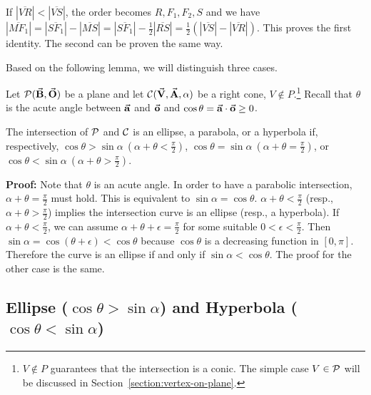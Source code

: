      If $|\overline{VR}|<|\overline{VS}|$, the order becomes $R,F_1,F_2,S$
and we have $|\overline{MF_1}|=|\overline{SF_1}|-|\overline{MS}|=
|\overline{SF_1}|-\frac{1}{2}|\overline{RS}|=\frac{1}{2}(|\overline{VS}|-
|\overline{VR}|)$.  
This proves the first identity.  The second can be proven the same way.  \QED

Based on the following lemma, we will distinguish three cases.

\begin{lemma}
\label{lemma:classification}
Let ${\cal P}(\vec{\bf B},\vec{\bf O})$ be a plane and 
let ${\cal C}(\vec{\bf V}, \vec{\bf A},\alpha)$ be a right cone, 
$V \not \in P$.\footnote{$V \not \in P$ guarantees that the 
     intersection is a conic.
     The simple case $V\in{\cal P}$ will be discussed in 
     Section~\ref{section:vertex-on-plane}.}
Recall that $\theta$
is the acute angle between $\vec{\bf a}$ and $\vec{\bf o}$ and 
$\cos\theta=\vec{\bf a}\cdot\vec{\bf o}\geq 0$.

     The intersection of ${\cal P}$ and ${\cal C}$
is an ellipse, a parabola, or a hyperbola if,
respectively, $\cos\theta>\sin\alpha\ (\alpha+\theta<\frac{\pi}{2})$, 
$\cos\theta=\sin\alpha\ (\alpha+\theta=\frac{\pi}{2})$, or 
$\cos\theta<\sin\alpha\ (\alpha+\theta>\frac{\pi}{2})$.
\end{lemma}
{\bf Proof:}  Note that $\theta$ is an acute angle. 
In order to have a parabolic intersection, 
$\alpha+\theta=\frac{\pi}{2}$ must hold.  This is equivalent to
$\sin\alpha=\cos\theta$.
$\alpha+\theta<\frac{\pi}{2}$ (resp., $\alpha+\theta>\frac{\pi}{2}$)
implies the intersection curve is an ellipse (resp., a hyperbola).
If $\alpha+\theta<\frac{\pi}{2}$,
we can assume $\alpha+\theta+\epsilon=\frac{\pi}{2}$ for some suitable
$0<\epsilon<\frac{\pi}{2}$.  Then $\sin\alpha=\cos(\theta+\epsilon)<\cos\theta$
because $\cos\theta$ is a decreasing function in $[0,\pi]$.  Therefore 
the curve is an ellipse if and only if $\sin\alpha<\cos\theta$.  The proof for
the other case is the same.  \QED


\subsection{Ellipse ($\cos\theta>\sin\alpha$) and 
          Hyperbola ($\cos\theta<\sin\alpha$)}
\label{section:ellipse}

